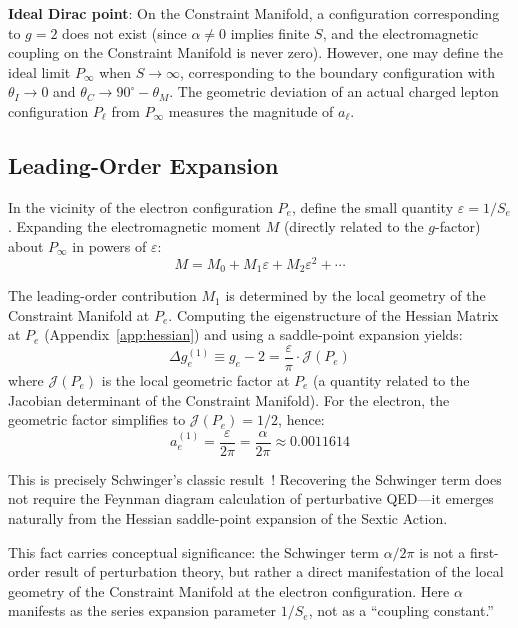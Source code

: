 \documentclass[aps,prd,reprint,nofootinbib]{revtex4-2}
\begin{document}
\textbf{Ideal Dirac point}: On the Constraint Manifold, a configuration corresponding to $g = 2$ does not exist (since $\alpha \neq 0$ implies finite $S$, and the electromagnetic coupling on the Constraint Manifold is never zero). However, one may define the ideal limit $P_\infty$ when $S \to \infty$, corresponding to the boundary configuration with $\theta_I \to 0$ and $\theta_C \to 90^\circ - \theta_M$. The geometric deviation of an actual charged lepton configuration $P_\ell$ from $P_\infty$ measures the magnitude of $a_\ell$.

\subsection{Leading-Order Expansion}

In the vicinity of the electron configuration $P_e$, define the small quantity $\varepsilon = 1/S_e$. Expanding the electromagnetic moment $M$ (directly related to the $g$-factor) about $P_\infty$ in powers of $\varepsilon$:
\begin{equation}
M = M_0 + M_1 \varepsilon + M_2 \varepsilon^2 + \cdots
\end{equation}

The leading-order contribution $M_1$ is determined by the local geometry of the Constraint Manifold at $P_e$. Computing the eigenstructure of the Hessian Matrix at $P_e$ (Appendix~\ref{app:hessian}) and using a saddle-point expansion yields:
\begin{equation}
\Delta g_e^{(1)} \equiv g_e - 2 = \frac{\varepsilon}{\pi} \cdot \mathcal{J}(P_e) \label{eq:delta_g}
\end{equation}
where $\mathcal{J}(P_e)$ is the local geometric factor at $P_e$ (a quantity related to the Jacobian determinant of the Constraint Manifold). For the electron, the geometric factor simplifies to $\mathcal{J}(P_e) = 1/2$, hence:
\begin{equation}
\boxed{a_e^{(1)} = \frac{\varepsilon}{2\pi} = \frac{\alpha}{2\pi} \approx 0.0011614} \label{eq:schwinger}
\end{equation}

This is precisely Schwinger's classic result~\cite{Schwinger1948}! Recovering the Schwinger term does not require the Feynman diagram calculation of perturbative QED---it emerges naturally from the Hessian saddle-point expansion of the Sextic Action.

This fact carries conceptual significance: the Schwinger term $\alpha/2\pi$ is not a first-order result of perturbation theory, but rather a direct manifestation of the local geometry of the Constraint Manifold at the electron configuration. Here $\alpha$ manifests as the series expansion parameter $1/S_e$, not as a ``coupling constant.''
\end{document}

